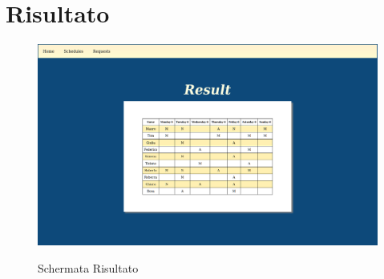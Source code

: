 \section{Risultato}
\begin{figure}[H]
\begin{center}
  \includegraphics[scale=0.20]{img/Schermate/Result.png}\\
  \caption{Schermata Risultato}
\end{center}
\end{figure}
